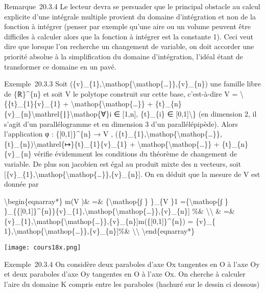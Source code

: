 \documentclass[]{article}
\begin{document}
Remarque~20.3.4 Le lecteur devra se persuader que le principal obstacle
au calcul explicite d'une intégrale multiple provient du domaine
d'intégration et non de la fonction à intégrer (penser par exemple
qu'une aire ou un volume peuvent être difficiles à calculer alors que la
fonction à intégrer est la constante 1). Ceci veut dire que lorsque l'on
recherche un changement de variable, on doit accorder une priorité
absolue à la simplification du domaine d'intégration, l'idéal étant de
transformer ce domaine en un pavé.

Exemple~20.3.3 Soit
(\{v\}\_\{1\},\textbackslash{}mathop\{\textbackslash{}mathop\{\ldots{}\}\},\{v\}\_\{n\})
une famille libre de \{ℝ\}\^{}\{n\} et soit V le polytope construit sur
cette base, c'est-à-dire V = \textbackslash{}\{\{t\}\_\{1\}\{v\}\_\{1\}
+ \textbackslash{}mathop\{\textbackslash{}mathop\{\ldots{}\}\} +
\{t\}\_\{n\}\{v\}\_\{n\}\textbackslash{}mathrel\{∣\}\textbackslash{}mathop\{∀\}i
∈ {[}1,n{]}, \{t\}\_\{i\} ∈ {[}0,1{]}\textbackslash{}\} (en dimension 2,
il s'agit d'un parallélogramme et en dimension 3 d'un parallélépipède).
Alors l'application φ : \{{[}0,1{]}\}\^{}\{n\} → V ,
(\{t\}\_\{1\},\textbackslash{}mathop\{\textbackslash{}mathop\{\ldots{}\}\},\{t\}\_\{n\})\textbackslash{}mathrel\{↦\}\{t\}\_\{1\}\{v\}\_\{1\}
+ \textbackslash{}mathop\{\textbackslash{}mathop\{\ldots{}\}\} +
\{t\}\_\{n\}\{v\}\_\{n\} vérifie évidemment les conditions du théorème
de changement de variable. De plus son jacobien est égal au produit
mixte des n vecteurs, soit
{[}\{v\}\_\{1\},\textbackslash{}mathop\{\textbackslash{}mathop\{\ldots{}\}\},\{v\}\_\{n\}{]}.
On en déduit que la mesure de V est donnée par

\textbackslash{}begin\{eqnarray*\} m(V )\& =\&
\{\textbackslash{}mathop\{∫ \} \}\_\{V \}1 =\{\textbackslash{}mathop\{∫
\}
\}\_\{\{{[}0,1{]}\}\^{}\{n\}\}\textbar{}{[}\{v\}\_\{1\},\textbackslash{}mathop\{\textbackslash{}mathop\{\ldots{}\}\},\{v\}\_\{n\}{]}\textbar{}
\%\& \textbackslash{}\textbackslash{} \& =\&
\textbar{}{[}\{v\}\_\{1\},\textbackslash{}mathop\{\textbackslash{}mathop\{\ldots{}\}\},\{v\}\_\{n\}{]}\textbar{}m(\{{[}0,1{]}\}\^{}\{n\})
= \textbar{}{[}\{v\}\_\{
1\},\textbackslash{}mathop\{\textbackslash{}mathop\{\ldots{}\}\},\{v\}\_\{n\}{]}\textbar{}\%\&
\textbackslash{}\textbackslash{} \textbackslash{}end\{eqnarray*\}

\texttt{[image: cours18x.png]}

Exemple~20.3.4 On considère deux paraboles d'axe Ox tangentes en O à
l'axe Oy et deux paraboles d'axe Oy tangentes en O à l'axe Ox. On
cherche à calculer l'aire du domaine K compris entre les paraboles
(hachuré sur le dessin ci dessous)
\end{document}
